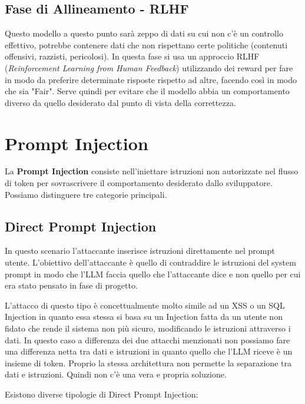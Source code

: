 \subsection{Fase di Allineamento - RLHF}

Questo modello a questo punto sarà zeppo di dati su cui non c'è un controllo 
effettivo, potrebbe contenere dati che non rispettano certe politiche 
(contenuti offensivi, razzisti, pericolosi). In questa fase si usa un 
approccio RLHF (\textit{Reinforcement Learning from Human Feedback}) 
utilizzando dei reward per fare in modo da preferire determinate risposte 
rispetto ad altre, facendo così in modo che sia "Fair".
Serve quindi per evitare che il modello abbia un comportamento diverso da 
quello desiderato dal punto di vista della correttezza.

\section{Prompt Injection}

La \textbf{Prompt Injection} consiste nell'iniettare istruzioni non 
autorizzate nel flusso di token per sovrascrivere il comportamento 
desiderato dallo sviluppatore. Possiamo distinguere tre categorie principali.

\subsection{Direct Prompt Injection}

In questo scenario l'attaccante inserisce istruzioni direttamente nel 
prompt utente. L'obiettivo dell'attaccante è quello di contraddire le 
istruzioni del system prompt in modo che l'LLM faccia quello che l'attaccante 
dice e non quello per cui era stato pensato in fase di progetto.

L'attacco di questo tipo è concettualmente molto simile ad un XSS o un SQL 
Injection in quanto essa stessa si basa su un Injection fatta da un utente 
non fidato che rende il sistema non più sicuro, modificando le istruzioni 
attraverso i dati. In questo caso a differenza dei due attacchi menzionati 
non possiamo fare una differenza netta tra dati e istruzioni in quanto 
quello che l'LLM riceve è un insieme di token. Proprio la stessa 
architettura non permette la separazione tra dati e istruzioni. Quindi non 
c'è una vera e propria soluzione.

Esistono diverse tipologie di Direct Prompt Injection:

